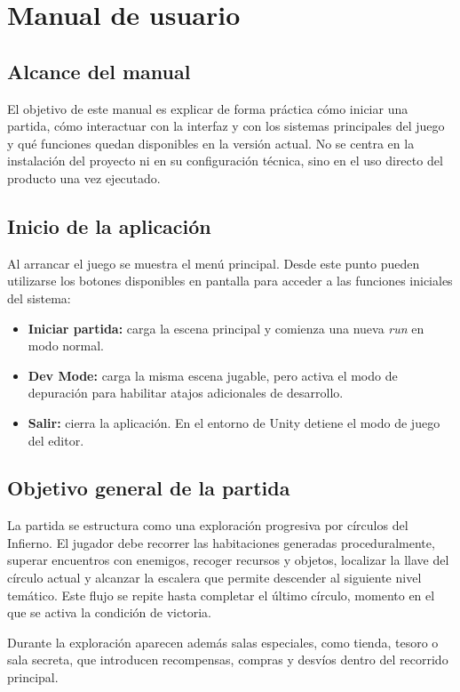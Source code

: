 \chapter{Manual de usuario}

\section{Alcance del manual}
El objetivo de este manual es explicar de forma práctica cómo iniciar una partida, cómo
interactuar con la interfaz y con los sistemas principales del juego y qué funciones quedan
disponibles en la versión actual. No se centra en la instalación del proyecto ni en su
configuración técnica, sino en el uso directo del producto una vez ejecutado.

\section{Inicio de la aplicación}
Al arrancar el juego se muestra el menú principal. Desde este punto pueden utilizarse los
botones disponibles en pantalla para acceder a las funciones iniciales del sistema:

\begin{itemize}
    \item \textbf{Iniciar partida:} carga la escena principal y comienza una nueva \textit{run} en modo normal.
    \item \textbf{Dev Mode:} carga la misma escena jugable, pero activa el modo de depuración para habilitar atajos adicionales de desarrollo.
    \item \textbf{Salir:} cierra la aplicación. En el entorno de Unity detiene el modo de juego del editor.
\end{itemize}

\section{Objetivo general de la partida}
La partida se estructura como una exploración progresiva por círculos del Infierno. El
jugador debe recorrer las habitaciones generadas proceduralmente, superar encuentros con
enemigos, recoger recursos y objetos, localizar la llave del círculo actual y alcanzar la
escalera que permite descender al siguiente nivel temático. Este flujo se repite hasta
completar el último círculo, momento en el que se activa la condición de victoria.

Durante la exploración aparecen además salas especiales, como tienda, tesoro o sala secreta,
que introducen recompensas, compras y desvíos dentro del recorrido principal.

